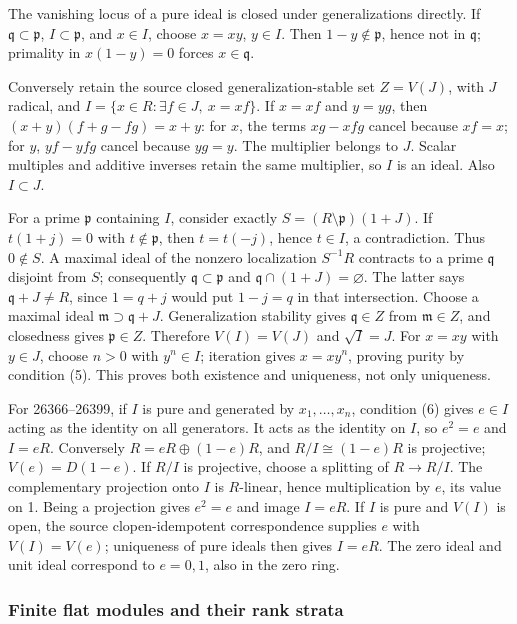 The vanishing locus of a pure ideal is closed under generalizations directly. If \(\mathfrak q\subset\mathfrak p\), \(I\subset\mathfrak p\), and \(x\in I\), choose \(x=xy\), \(y\in I\). Then \(1-y\notin\mathfrak p\), hence not in \(\mathfrak q\); primality in \(x(1-y)=0\) forces \(x\in\mathfrak q\).

Conversely retain the source closed generalization-stable set \(Z=V(J)\), with \(J\) radical, and \(I=\{x\in R:\exists f\in J,\ x=xf\}\). If \(x=xf\) and \(y=yg\), then \((x+y)(f+g-fg)=x+y\): for \(x\), the terms \(xg-xfg\) cancel because \(xf=x\); for \(y\), \(yf-yfg\) cancel because \(yg=y\). The multiplier belongs to \(J\). Scalar multiples and additive inverses retain the same multiplier, so \(I\) is an ideal. Also \(I\subset J\).

For a prime \(\mathfrak p\) containing \(I\), consider exactly \(S=(R\setminus\mathfrak p)(1+J)\). If \(t(1+j)=0\) with \(t\notin\mathfrak p\), then \(t=t(-j)\), hence \(t\in I\), a contradiction. Thus \(0\notin S\). A maximal ideal of the nonzero localization \(S^{-1}R\) contracts to a prime \(\mathfrak q\) disjoint from \(S\); consequently \(\mathfrak q\subset\mathfrak p\) and \(\mathfrak q\cap(1+J)=\varnothing\). The latter says \(\mathfrak q+J\ne R\), since \(1=q+j\) would put \(1-j=q\) in that intersection. Choose a maximal ideal \(\mathfrak m\supset\mathfrak q+J\). Generalization stability gives \(\mathfrak q\in Z\) from \(\mathfrak m\in Z\), and closedness gives \(\mathfrak p\in Z\). Therefore \(V(I)=V(J)\) and \(\sqrt I=J\). For \(x=xy\) with \(y\in J\), choose \(n>0\) with \(y^n\in I\); iteration gives \(x=xy^n\), proving purity by condition (5). This proves both existence and uniqueness, not only uniqueness.

For 26366--26399, if \(I\) is pure and generated by \(x_1,\ldots,x_n\), condition (6) gives \(e\in I\) acting as the identity on all generators. It acts as the identity on \(I\), so \(e^2=e\) and \(I=eR\). Conversely \(R=eR\oplus(1-e)R\), and \(R/I\cong(1-e)R\) is projective; \(V(e)=D(1-e)\). If \(R/I\) is projective, choose a splitting of \(R\to R/I\). The complementary projection onto \(I\) is \(R\)-linear, hence multiplication by \(e\), its value on 1. Being a projection gives \(e^2=e\) and image \(I=eR\). If \(I\) is pure and \(V(I)\) is open, the source clopen-idempotent correspondence supplies \(e\) with \(V(I)=V(e)\); uniqueness of pure ideals then gives \(I=eR\). The zero ideal and unit ideal correspond to \(e=0,1\), also in the zero ring.

\subsubsection{Finite flat modules and their rank strata}\label{algebra-proof-022-finite-flat-modules-and-their-rank-strata}

